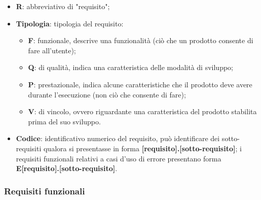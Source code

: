 \begin{itemize}
    \item \textbf{R}: abbreviativo di "requisito";
    \item \textbf{Tipologia}: tipologia del requisito:
        \begin{itemize}
            \item \textbf{F}: funzionale, descrive una funzionalità (ciò che un prodotto consente di fare all'utente);
            \item \textbf{Q}: di qualità, indica una caratteristica delle modalità di sviluppo;
            \item \textbf{P}: prestazionale, indica alcune caratteristiche che il prodotto deve avere durante l'esecuzione (non ciò che consente di fare);
            \item \textbf{V}: di vincolo, ovvero riguardante una caratteristica del prodotto stabilita prima del suo sviluppo.
        \end{itemize}
    \item \textbf{Codice}: identificativo numerico del requisito, può identificare dei sotto-requisiti qualora si presentasse in forma \textbf{[requisito].[sotto-requisito]}; i requisiti funzionali relativi a casi d’uso di errore presentano forma \textbf{E[requisito].[sotto-requisito]}.
\end{itemize}

\subsubsection*{Requisiti funzionali}

